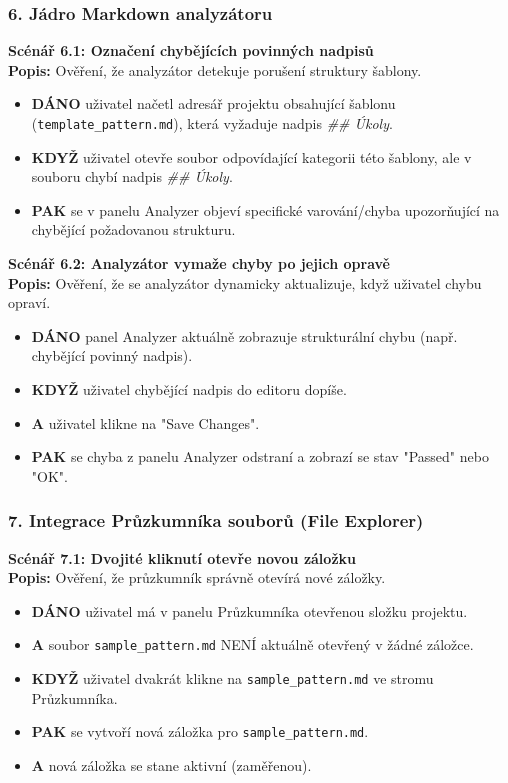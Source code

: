 \documentclass[12pt, a4paper]{article}
\begin{document}
\subsubsection*{6. Jádro Markdown analyzátoru}

\textbf{Scénář 6.1: Označení chybějících povinných nadpisů} \\
\textbf{Popis:} Ověření, že analyzátor detekuje porušení struktury šablony.
\begin{itemize}
    \item \textbf{DÁNO} uživatel načetl adresář projektu obsahující šablonu (\texttt{template\_pattern.md}), která vyžaduje nadpis \textit{\#\# Úkoly}.
    \item \textbf{KDYŽ} uživatel otevře soubor odpovídající kategorii této šablony, ale v souboru chybí nadpis \textit{\#\# Úkoly}.
    \item \textbf{PAK} se v panelu Analyzer objeví specifické varování/chyba upozorňující na chybějící požadovanou strukturu.
\end{itemize}

\textbf{Scénář 6.2: Analyzátor vymaže chyby po jejich opravě} \\
\textbf{Popis:} Ověření, že se analyzátor dynamicky aktualizuje, když uživatel chybu opraví.
\begin{itemize}
    \item \textbf{DÁNO} panel Analyzer aktuálně zobrazuje strukturální chybu (např. chybějící povinný nadpis).
    \item \textbf{KDYŽ} uživatel chybějící nadpis do editoru dopíše.
    \item \textbf{A} uživatel klikne na "Save Changes".
    \item \textbf{PAK} se chyba z panelu Analyzer odstraní a zobrazí se stav "Passed" nebo "OK".
\end{itemize}

\subsubsection*{7. Integrace Průzkumníka souborů (File Explorer)}

\textbf{Scénář 7.1: Dvojité kliknutí otevře novou záložku} \\
\textbf{Popis:} Ověření, že průzkumník správně otevírá nové záložky.
\begin{itemize}
    \item \textbf{DÁNO} uživatel má v panelu Průzkumníka otevřenou složku projektu.
    \item \textbf{A} soubor \texttt{sample\_pattern.md} NENÍ aktuálně otevřený v žádné záložce.
    \item \textbf{KDYŽ} uživatel dvakrát klikne na \texttt{sample\_pattern.md} ve stromu Průzkumníka.
    \item \textbf{PAK} se vytvoří nová záložka pro \texttt{sample\_pattern.md}.
    \item \textbf{A} nová záložka se stane aktivní (zaměřenou).
\end{itemize}
\end{document}
